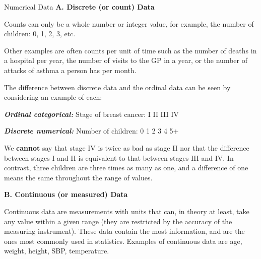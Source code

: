 \documentclass[
  ignorenonframetext,
]{beamer}
\begin{document}
\begin{frame}{Numerical Data}
\protect\hypertarget{numerical-data}{}
{\textbf{A. Discrete (or count) Data}}

Counts can only be a whole number or integer value, for example, {the
number of children: 0, 1, 2, 3, etc}.

Other examples are often {counts per unit of time} such as the number of
deaths in a hospital per year, the number of visits to the GP in a year,
or the number of attacks of asthma a person has per month.

The difference between discrete data and the ordinal data can be seen by
considering an example of each:

\begin{tcolorbox}[enhanced jigsaw, colframe=quarto-callout-note-color-frame, colback=white, rightrule=.15mm, opacitybacktitle=0.6, opacityback=0, toprule=.15mm, breakable, colbacktitle=quarto-callout-note-color!10!white, bottomtitle=1mm, bottomrule=.15mm, title={\textbf{Example: Ordinal Vs Discrete data}}, left=2mm, toptitle=1mm, titlerule=0mm, coltitle=black, arc=.35mm, leftrule=.75mm]
\textbf{\emph{Ordinal categorical:}} Stage of breast cancer: I II III IV

\textbf{\emph{Discrete numerical:}} Number of children: 0 1 2 3 4 5+

We \textbf{cannot} say that stage IV is twice as bad as stage II nor
that the difference between stages I and II is equivalent to that
between stages III and IV. In contrast, three children are three times
as many as one, and a difference of one means the same throughout the
range of values.
\end{tcolorbox}

{\textbf{Β. Continuous (or measured) Data}}

Continuous data are measurements with units that can, in theory at
least, {take any value within a given range} (they are restricted by the
accuracy of the measuring instrument). These data contain the most
information, and are the ones most commonly used in statistics. Examples
of continuous data are {age, weight, height, SBP, temperature}.

\begin{tcolorbox}[enhanced jigsaw, colframe=quarto-callout-important-color-frame, colback=white, rightrule=.15mm, opacitybacktitle=0.6, opacityback=0, toprule=.15mm, breakable, colbacktitle=quarto-callout-important-color!10!white, bottomtitle=1mm, bottomrule=.15mm, title=\textcolor{quarto-callout-important-color}{\faExclamation}\hspace{0.5em}{Categorization of numerical data leads to a loss of information}, left=2mm, toptitle=1mm, titlerule=0mm, coltitle=black, arc=.35mm, leftrule=.75mm]


\end{tcolorbox}
\end{frame}
\end{document}
